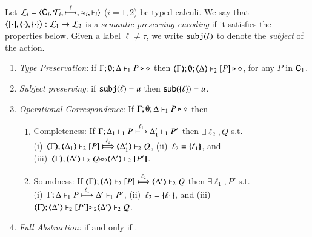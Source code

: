 \begin{definition}\rm
\label{def:ep}
	Let
	$\tyl{L}_i=\calc{\CAL_i}{{\cal{T}}_i}{\hby{\ell}}{\wb_i}{\proves_i}$
	($i=1,2$) be typed calculi. 
	We say that
	$\enco{\map{\cdot}, \mapt{\cdot}, \mapa{\cdot}}: \tyl{L}_1 \to \tyl{L}_2$
	is a \emph{semantic preserving encoding}
	if it satisfies the properties below.
	Given a label $\ell \neq \tau$, we write 
	$\subj{\ell}$
	to denote the \emph{subject} of the action.
	
	\begin{enumerate}[1.]
		\item	\emph{Type Preservation}:
			if
			$\Gamma; \emptyset; \Delta \proves_1 P \hastype \Proc$ then 
			$\mapt{\Gamma}; \emptyset; \mapt{\Delta} \proves_2 \map{P} \hastype \Proc$,  
			for any   $P$ in $\CAL_1$.
		\item	\emph{Subject preserving}: if $\subj{\ell} = u$ then $\mathsf{sub}(\mapa{\ell}) =u$.


		\item	\emph{Operational Correspondence}:
			If $\Gamma; \emptyset; \Delta \proves_1 P \hastype \Proc$ then
			\begin{enumerate}
				\item	Completeness: 
					If  
					$\stytraarg{\Gamma}{\ell_1}{\Delta_1}{P}{\Delta'_1}{P'}{1}$
					then $\exists \ell_2, Q$ s.t. \\
					(i)~$\wtytraarg{\mapt{\Gamma}}{\ell_2}{\mapt{\Delta_1}}{\map{P}}{\mapt{\Delta'_1}}{Q}{2}$,
					(ii)~$\ell_2 = \mapa{\ell_1}$, 
					and \\
					(iii)~${\mapt{\Gamma}};{\mapt{\Delta'}}\proves_2 {Q}{\wb_2}{\mapt{\Delta'}}\proves_2 {\map{P'}}$.
				
				\item	Soundness:   
					If  $\wtytraarg{\mapt{\Gamma}}{\ell_2}{\mapt{\Delta}}{\map{P}}{\mapt{\Delta'}}{Q}{2}$
					then $\exists \ell_1, P'$ s.t.  \\
					(i)~$\stytraarg{\Gamma}{\ell_1}{\Delta}{P}{\Delta'}{P'}{1}$,
					(ii)~$\ell_2 = \mapa{\ell_1}$, and
					(iii)~
					${\mapt{\Gamma}};{\mapt{\Delta'}}\proves_2 {\map{P'}}{\wb_2}
					{\mapt{\Delta'}}\proves_2 {Q}$.
		\end{enumerate}
		
		\item	\emph{Full Abstraction:} 
			if and only if
			.
	\end{enumerate}
\end{definition}


